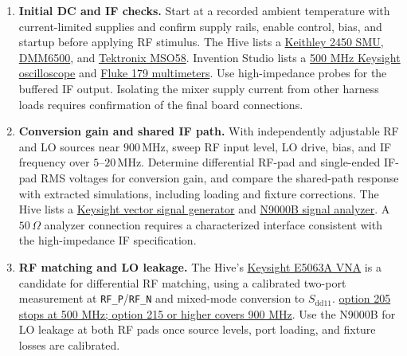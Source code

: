 \begin{enumerate}
    \item \textbf{Initial DC and IF checks.}
    Start at a recorded ambient temperature with current-limited supplies and confirm supply rails, enable control, bias, and startup before applying RF stimulus.
    The Hive lists a \href{https://wiki.hivemakerspace.com/explore/electronics-benchtop/}{Keithley 2450 SMU},
    \href{https://wiki.hivemakerspace.com/explore/electronics-benchtop/}{DMM6500}, and
    \href{https://wiki.hivemakerspace.com/explore/electronics-benchtop/}{Tektronix MSO58}.
    Invention Studio lists a \href{https://inventionstudio.gatech.edu/tools-equipment/electronics/}{500 MHz Keysight oscilloscope} and
    \href{https://inventionstudio.gatech.edu/tools-equipment/electronics/}{Fluke 179 multimeters}.
    Use high-impedance probes for the buffered IF output.
    Isolating the mixer supply current from other harness loads requires confirmation of the final board connections.

    \item \textbf{Conversion gain and shared IF path.}
    With independently adjustable RF and LO sources near \(900\,\mathrm{MHz}\), sweep RF input level, LO drive, bias, and IF frequency over \(5\)--\(20\,\mathrm{MHz}\).
    Determine differential RF-pad and single-ended IF-pad RMS voltages for conversion gain, and compare the shared-path response with extracted simulations, including loading and fixture corrections.
    The Hive lists a \href{https://wiki.hivemakerspace.com/explore/electronics-benchtop/}{Keysight vector signal generator} and
    \href{https://wiki.hivemakerspace.com/explore/electronics-benchtop/}{N9000B signal analyzer}.
    A \(50\,\Omega\) analyzer connection requires a characterized interface consistent with the high-impedance IF specification.

    \item \textbf{RF matching and LO leakage.}
    The Hive's \href{https://wiki.hivemakerspace.com/explore/electronics-benchtop/}{Keysight E5063A VNA} is a candidate for differential RF matching, using a calibrated two-port measurement at \texttt{RF\_P}/\texttt{RF\_N} and mixed-mode conversion to \(S_{\mathrm{dd}11}\).
    \href{https://helpfiles.keysight.com/csg/e5063a/product_information/options.htm}{option 205 stops at 500 MHz; option 215 or higher covers 900 MHz}.
    Use the N9000B for LO leakage at both RF pads once source levels, port loading, and fixture losses are calibrated.


\end{enumerate}
